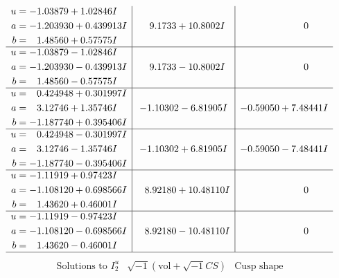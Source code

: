 \documentclass[1p]{elsarticle_modified}
\theoremstyle{definition}
\newcommand{\I}{\sqrt{-1}}
\begin{document}
$$\begin{array}{c|c|c}
\begin{aligned}
u &= -1.03879 + 1.02846 I \\
a &= -1.203930 + 0.439913 I \\
b &= \phantom{-}1.48560 + 0.57575 I\end{aligned}
 & \phantom{-}9.1733 + 10.8002 I & \phantom{-0.000000 } 0 \\ \hline\begin{aligned}
u &= -1.03879 - 1.02846 I \\
a &= -1.203930 - 0.439913 I \\
b &= \phantom{-}1.48560 - 0.57575 I\end{aligned}
 & \phantom{-}9.1733 - 10.8002 I & \phantom{-0.000000 } 0 \\ \hline\begin{aligned}
u &= \phantom{-}0.424948 + 0.301997 I \\
a &= \phantom{-}3.12746 + 1.35746 I \\
b &= -1.187740 + 0.395406 I\end{aligned}
 & -1.10302 - 6.81905 I & -0.59050 + 7.48441 I \\ \hline\begin{aligned}
u &= \phantom{-}0.424948 - 0.301997 I \\
a &= \phantom{-}3.12746 - 1.35746 I \\
b &= -1.187740 - 0.395406 I\end{aligned}
 & -1.10302 + 6.81905 I & -0.59050 - 7.48441 I \\ \hline\begin{aligned}
u &= -1.11919 + 0.97423 I \\
a &= -1.108120 + 0.698566 I \\
b &= \phantom{-}1.43620 + 0.46001 I\end{aligned}
 & \phantom{-}8.92180 + 10.48110 I & \phantom{-0.000000 } 0 \\ \hline\begin{aligned}
u &= -1.11919 - 0.97423 I \\
a &= -1.108120 - 0.698566 I \\
b &= \phantom{-}1.43620 - 0.46001 I\end{aligned}
 & \phantom{-}8.92180 - 10.48110 I & \phantom{-0.000000 } 0\\
 \hline 
 \end{array}$$\newpage$$\begin{array}{c|c|c}  
\text{Solutions to }I^u_{2}& \I (\text{vol} + \sqrt{-1}CS) & \text{Cusp shape}\\
 \hline 
\begin{aligned}

\end{aligned}
\end{array}$$
\end{document}

